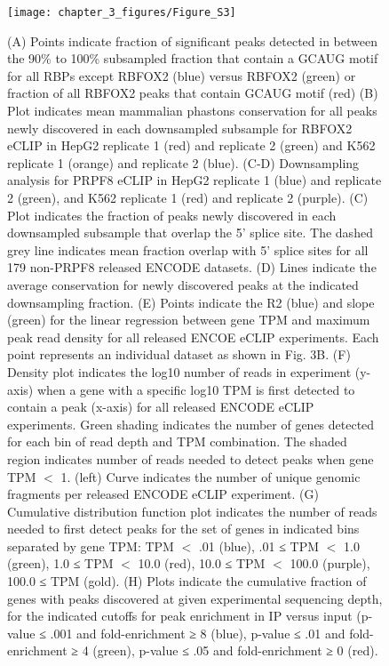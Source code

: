\begin{figure}[ht]
  \centering
  \texttt{[image: chapter\_3\_figures/Figure\_S3]}
  \caption[Supplementary Figure 3. Dependency of peak discovery on sequencing depth]{(A) Points indicate fraction of significant peaks detected in between the 90\% to 100\% subsampled fraction that contain a GCAUG motif for all RBPs except RBFOX2 (blue) versus RBFOX2 (green) or fraction of all RBFOX2 peaks that contain GCAUG motif (red) (B) Plot indicates mean mammalian phastons conservation for all peaks newly discovered in each downsampled subsample for RBFOX2 eCLIP in HepG2 replicate 1 (red) and replicate 2 (green) and K562 replicate 1 (orange) and replicate 2 (blue). (C-D) Downsampling analysis for PRPF8 eCLIP in HepG2 replicate 1 (blue) and replicate 2 (green), and K562 replicate 1 (red) and replicate 2 (purple). (C) Plot indicates the fraction of peaks newly discovered in each downsampled subsample that overlap the 5’ splice site. The dashed grey line indicates mean fraction overlap with 5’ splice sites for all 179 non-PRPF8 released ENCODE datasets. (D) Lines indicate the average conservation for newly discovered peaks at the indicated downsampling fraction. (E) Points indicate the R2 (blue) and slope (green) for the linear regression between gene TPM and maximum peak read density for all released ENCOE eCLIP experiments. Each point represents an individual dataset as shown in Fig. 3B. (F) Density plot indicates the log10 number of reads in experiment (y-axis) when a gene with a specific log10 TPM is first detected to contain a peak (x-axis) for all released ENCODE eCLIP experiments. Green shading indicates the number of genes detected for each bin of read depth and TPM combination. The shaded region indicates number of reads needed to detect peaks when gene TPM $<$ 1. (left) Curve indicates the number of unique genomic fragments per released ENCODE eCLIP experiment. (G) Cumulative distribution function plot indicates the number of reads needed to first detect peaks for the set of genes in indicated bins separated by gene TPM: TPM $<$ .01 (blue), .01 ≤ TPM $<$ 1.0 (green), 1.0 ≤ TPM $<$ 10.0 (red), 10.0 ≤ TPM $<$ 100.0 (purple), 100.0 ≤ TPM (gold). (H) Plots indicate the cumulative fraction of genes with peaks discovered at given experimental sequencing depth, for the indicated cutoffs for peak enrichment in IP versus input (p-value ≤ .001 and fold-enrichment ≥ 8 (blue), p-value ≤ .01 and fold-enrichment ≥ 4 (green), p-value ≤ .05 and fold-enrichment ≥ 0 (red).}
  \label{fig:Figure_S3}
\end{figure}

